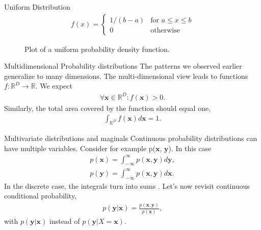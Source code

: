 \documentclass[notes]{beamer}
\begin{document}
    \begin{frame}{Uniform Distribution}
      \begin{align}
        f(x) = \begin{cases}
        1/(b-a)   &    \text{for } a \leq x \leq b \\
        0         &    \text{otherwise}  
        \end{cases}
      \end{align}
      \begin{figure}
      
      \caption{Plot of a uniform probability density function.}
      \end{figure}
    \end{frame}

    \begin{frame}{Multidimensional Probability distributions \cite{deisenroth2020mathematics}}
      The patterns we observed earlier generalize to many dimensions.
      The multi-dimensional view leads to functions $f: \mathbb{R}^D \rightarrow \mathbb{R}$.
      We expect
      \begin{align}
        \forall \mathbf{x} \in \mathbb{R}^D : f(\mathbf{x}) > 0.
      \end{align}
      Similarly, the total area covered by the function should equal one,
      \begin{align}
        \int_{\mathbb{R}^D} f(\mathbf{x}) d\mathbf{x} = 1.
      \end{align}
    
    \end{frame}

    \begin{frame}{Multivariate distributions and maginals}
      Continuous probability distributions can have multiple variables.
      Consider for example p($\mathbf{x}$, $\mathbf{y}$).
      In this case 
      \begin{align}
        p(\mathbf{x}) = \int_{-\infty}^{\infty} p(\mathbf{x}, \mathbf{y}) d\mathbf{y}, \\
        p(\mathbf{y}) = \int_{-\infty}^{\infty} p(\mathbf{x}, \mathbf{y}) d\mathbf{x}.
      \end{align}
      In the discrete case, the integrals turn into sums \cite{deisenroth2020mathematics}.
      Let's now revisit continuous conditional probability,
      \begin{align}
        p(\mathbf{y}|\mathbf{x}) = \frac{p(\mathbf{x}, \mathbf{y})}{p(\mathbf{x})},
      \end{align}
      with $p(\mathbf{y}|\mathbf{x})$ instead of $p(\mathbf{y}|X = \mathbf{x})$.
    \end{frame}
\end{document}
